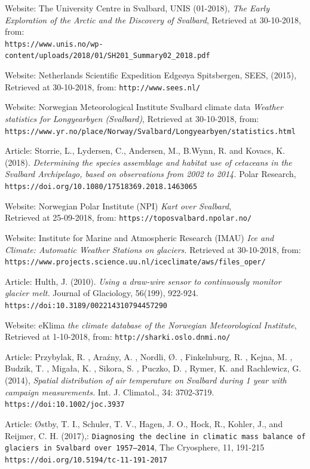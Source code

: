 \documentclass[11pt]{report}
\begin{document}
\begin{thebibliography}{9}

Website: The University Centre in Svalbard, UNIS (01-2018), 
\textit{The Early Exploration of the Arctic and the Discovery of
Svalbard},
Retrieved at 30-10-2018, from:\\
\texttt{\small{https://www.unis.no/wp-content/uploads/2018/01/SH201\_Summary02\_2018.pdf}}

Website: Netherlands Scientific Expedition Edge{\o}ya Spitsbergen, SEES, (2015), \\ Retrieved at 30-10-2018, from:
\texttt{\small{http://www.sees.nl/}}

Website: Norwegian Meteorological Institute Svalbard climate data
\textit{Weather statistics for Longyearbyen (Svalbard)},
Retrieved at 30-10-2018, from:
\texttt{https://www.yr.no/place/Norway/Svalbard/Longyearbyen/statistics.html}

Article: Storrie, L., Lydersen, C., Andersen, M., B.Wynn, R. and Kovacs, K. (2018). 
\textit{Determining the species assemblage and habitat use of cetaceans in the Svalbard Archipelago, based on observations from 2002 to 2014.} Polar Research, \texttt{ https://doi.org/10.1080/17518369.2018.1463065} 

Website: Norwegian Polar Institute (NPI) 
\textit{Kart over Svalbard},\\
Retrieved at 25-09-2018, from: \texttt{https://toposvalbard.npolar.no/}

Website: Institute for Marine and Atmospheric Research (IMAU)
\textit{Ice and Climate: Automatic Weather Stations on glaciers.}
Retrieved at 30-10-2018, from:
\texttt{https://www.projects.science.uu.nl/iceclimate/aws/files\_oper/}

Article: Hulth, J. (2010). 
\textit{Using a draw-wire sensor to continuously monitor glacier melt.} Journal of Glaciology, 56(199), 922-924. 
\texttt{https://doi:10.3189/002214310794457290}

Website: eKlima \textit{the climate database of the Norwegian Meteorological Institute}, Retrieved at 1-10-2018, from:
\texttt{http://sharki.oslo.dnmi.no/}

Article: Przybylak, R. , Araźny, A. , Nordli, {\O}. , Finkelnburg, R. , Kejna, M. , Budzik, T. , Migała, K. , Sikora, S. , Puczko, D. , Rymer, K. and Rachlewicz, G. (2014), \textit{Spatial distribution of air temperature on Svalbard during 1 year with campaign measurements.} Int. J. Climatol., 34: 3702-3719. \texttt{https://doi:10.1002/joc.3937}

Article: {\O}stby, T. I., Schuler, T. V., Hagen, J. O., Hock, R., Kohler, J., and Reijmer, C. H.  (2017),: \texttt{Diagnosing the decline in climatic mass balance of glaciers in Svalbard over 1957–2014}, The Cryosphere, 11, 191-215 \texttt{https://doi.org/10.5194/tc-11-191-2017}

\end{thebibliography}
\end{document}
